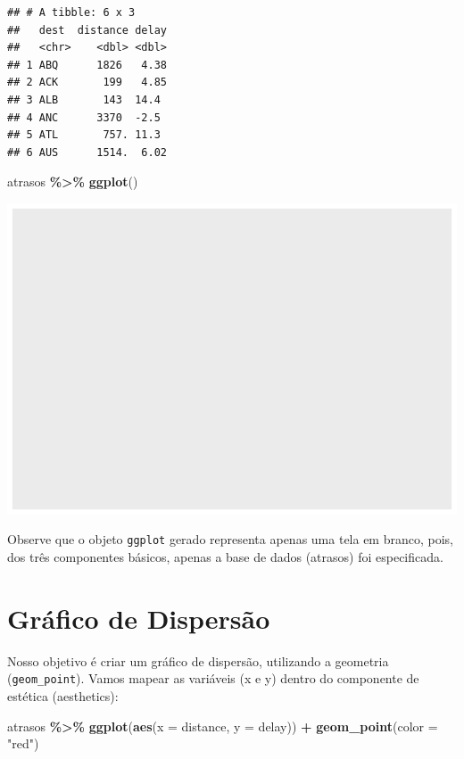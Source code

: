 \documentclass[
]{book}
\newenvironment{Shaded}{\begin{snugshade}}{\end{snugshade}}
\newcommand{\AttributeTok}[1]{\textcolor[rgb]{0.13,0.29,0.53}{#1}}
\newcommand{\FunctionTok}[1]{\textcolor[rgb]{0.13,0.29,0.53}{\textbf{#1}}}
\newcommand{\NormalTok}[1]{#1}
\newcommand{\SpecialCharTok}[1]{\textcolor[rgb]{0.81,0.36,0.00}{\textbf{#1}}}
\newcommand{\StringTok}[1]{\textcolor[rgb]{0.31,0.60,0.02}{#1}}
\begin{document}
\begin{verbatim}
## # A tibble: 6 x 3
##   dest  distance delay
##   <chr>    <dbl> <dbl>
## 1 ABQ      1826   4.38
## 2 ACK       199   4.85
## 3 ALB       143  14.4 
## 4 ANC      3370  -2.5 
## 5 ATL       757. 11.3 
## 6 AUS      1514.  6.02
\end{verbatim}

\begin{Shaded}
\begin{Highlighting}[]
\NormalTok{atrasos }\SpecialCharTok{\%\textgreater{}\%} \FunctionTok{ggplot}\NormalTok{()}
\end{Highlighting}
\end{Shaded}

\includegraphics{AprendendoR_files/figure-latex/unnamed-chunk-58-1.pdf}

Observe que o objeto \texttt{ggplot} gerado representa apenas uma tela em branco, pois, dos três componentes básicos, apenas a base de dados (atrasos) foi especificada.

\section{Gráfico de Dispersão}\label{gruxe1fico-de-dispersuxe3o}

Nosso objetivo é criar um gráfico de dispersão, utilizando a geometria (\texttt{geom\_point}).
Vamos mapear as variáveis (x e y) dentro do componente de estética (aesthetics):

\begin{Shaded}
\begin{Highlighting}[]
\NormalTok{atrasos }\SpecialCharTok{\%\textgreater{}\%} 
  \FunctionTok{ggplot}\NormalTok{(}\FunctionTok{aes}\NormalTok{(}\AttributeTok{x =}\NormalTok{ distance, }\AttributeTok{y =}\NormalTok{ delay)) }\SpecialCharTok{+}
  \FunctionTok{geom\_point}\NormalTok{(}\AttributeTok{color =} \StringTok{"red"}\NormalTok{)}
\end{Highlighting}
\end{Shaded}
\end{document}
